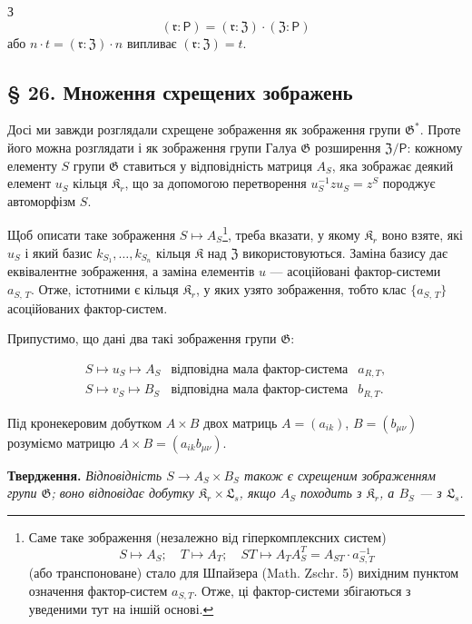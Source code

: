 \documentclass[11pt]{article}
\newcommand{\srcfn}[2]{\footnote{#2}}
\begin{document}
З
\[(\mathfrak{r}: \mathsf{P}) = (\mathfrak{r}: \mathfrak Z) \cdot (\mathfrak Z: \mathsf{P})\]
або \(n \cdot t = (\mathfrak{r}: \mathfrak Z) \cdot n\) випливає \((\mathfrak{r}: \mathfrak Z) = t\).

\subsection*{§ 26. Множення схрещених зображень}\label{multiplikation-der-verschraenkten-darstellungen}

Досі ми завжди розглядали схрещене зображення як зображення групи \(\mathfrak{G}^*\). Проте його можна розглядати і як зображення групи Галуа \(\mathfrak{G}\) розширення \(\mathfrak Z/\mathsf{P}\): кожному елементу \(S\) групи \(\mathfrak{G}\) ставиться у відповідність матриця \(A_S\), яка зображає деякий елемент \(u_S\) кільця \(\mathfrak K_r\), що за допомогою перетворення \(u_S^{-1}zu_S=z^S\) породжує автоморфізм \(S\).

Щоб описати таке зображення \(S\mapsto A_S\)\srcfn{1}{Саме таке зображення (незалежно від гіперкомплексних систем)
\[
S\mapsto A_S;\quad T\mapsto A_T;\quad ST\mapsto A_TA_S^T=A_{ST}\cdot a_{S,T}^{-1}
\]
(або транспоноване) стало для Шпайзера (Math. Zschr. 5) вихідним пунктом означення фактор-систем \(a_{S,T}\). Отже, ці фактор-системи збігаються з уведеними тут на іншій основі.}, треба вказати, у якому \(\mathfrak K_r\) воно взяте, які \(u_S\) і який базис \(k_{S_1},\ldots,k_{S_n}\) кільця \(\mathfrak K\) над \(\mathfrak Z\) використовуються. Заміна базису дає еквівалентне зображення, а заміна елементів \(u\) --- асоційовані фактор-системи \(a_{S,\,T}\). Отже, істотними є кільця \(\mathfrak K_r\), у яких узято зображення, тобто клас \(\{a_{S,\,T}\}\) асоційованих фактор-систем.

Припустимо, що дані два такі зображення групи \(\mathfrak G\):

\[
\begin{array}{lll}
S\mapsto u_S\mapsto A_S & \text{відповідна мала фактор-система} & a_{R,T},\\
S\mapsto v_S\mapsto B_S & \text{відповідна мала фактор-система} & b_{R,T}.
\end{array}
\]

Під кронекеровим добутком \(A\times B\) двох матриць \(A=(a_{ik})\), \(B=(b_{\mu\nu})\) розуміємо матрицю \(A\times B=(a_{ik}b_{\mu\nu})\).

\noindent\textbf{Твердження.} \emph{Відповідність \(S\to A_S\times B_S\) також є схрещеним зображенням групи \(\mathfrak G\); воно відповідає добутку \(\mathfrak K_r\times\mathfrak L_s\), якщо \(A_S\) походить з \(\mathfrak K_r\), а \(B_S\) --- з \(\mathfrak L_s\).}
\end{document}

